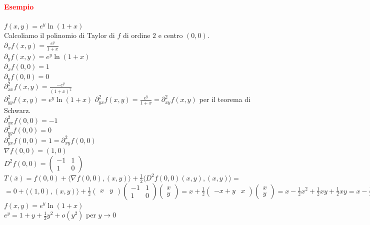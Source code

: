 \documentclass{article}
\begin{document}
\paragraph{\textcolor{red}{Esempio}}
$f(x,y)=e^y\ln(1+x)$\\
Calcoliamo il polinomio di Taylor di $f$ di ordine $2$ e centro $(0,0)$.\\
$\partial_xf(x,y)=\frac{e^y}{1+x}$\\
$\partial_y f(x,y) =e^y \ln(1+x)$\\
$\partial_xf(0,0)=1$\\
$\partial_y f(0,0)=0$\\
$\partial_{xx}^2f(x,y)=\frac{-e^y}{(1+x)^2}$\\
$\partial_{yy}^2f(x,y)=e^y\ln(1+x)$
$\partial_{yx}^2 f(x,y)=\frac{e^y}{1+x}=\partial_{xy}^2f(x,y)$ per il teorema di Schwarz.\\
$\partial_{xx}^2f(0,0)=-1$\\
$\partial_{yy}^2f(0,0)=0$\\
$\partial_{yx}^2f(0,0)=1=\partial_{xy}^2f(0,0)$\\
$\nabla f(0,0)=(1,0)$\\
$D^2f(0,0)=\begin{pmatrix}
    -1&1\\
    1&0
\end{pmatrix}$\\
$T(\overline{x})=f(0,0)+\langle\nabla f(0,0),(x,y) \rangle + \frac{1}{2}\langle D^2f(0,0)(x,y),(x,y) \rangle=$\\$=0+\langle (1,0),(x,y) \rangle + \frac{1}{2}\begin{pmatrix}
    x&y
\end{pmatrix}\begin{pmatrix}
    -1& 1\\
    1 &0
\end{pmatrix} \begin{pmatrix}
    x\\
    y
\end{pmatrix}=x+\frac{1}{2}\begin{pmatrix}
    -x+y & x
\end{pmatrix}\begin{pmatrix}
    x\\
    y
\end{pmatrix}=x-\frac{1}{2}x^2+\frac{1}{2}xy+\frac{1}{2}xy=x-\frac{1}{2}x^2+xy$\\
$f(x,y)=e^y\ln(1+x)$\\
$e^y=1+y+\frac{1}{2}y^2+o(y^2)$ per $y \rightarrow0$\\
\end{document}
